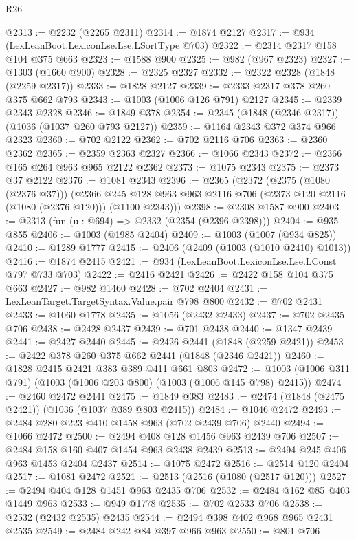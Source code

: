 \begin{lexlean}{R26}
\begin{coremodule}
@2313 := @2232 (@2265 @2311)
@2314 := @1874 @2127
@2317 := @934 (LexLeanBoot.LexiconLse.Lse.LSortType @703)
@2322 := @2314 @2317 @158 @104 @375 @663
@2323 := @1588 @900
@2325 := @982 (@967 @2323)
@2327 := @1303 (@1660 @900)
@2328 := @2325 @2327
@2332 := @2322 @2328 (@1848 (@2259 @2317))
@2333 := @1828 @2127
@2339 := @2333 @2317 @378 @260 @375 @662 @793
@2343 := @1003 (@1006 @126 @791) @2127
@2345 := @2339 @2343 @2328
@2346 := @1849 @378
@2354 := @2345 (@1848 (@2346 @2317)) (@1036 (@1037 @260 @793 @2127))
@2359 := @1164 @2343 @372 @374 @966 @2323
@2360 := @702 @2122
@2362 := @702 @2116 @706
@2363 := @2360 @2362
@2365 := @2359 @2363 @2327
@2366 := @1066 @2343
@2372 := @2366 @165 @264 @963 @965 @2122 @2362
@2373 := @1075 @2343
@2375 := @2373 @37 @2122
@2376 := @1081 @2343
@2396 := @2365
    (@2372
      (@2375 (@1080 (@2376 @37)))
      (@2366 @245 @128 @963 @963 @2116 @706 (@2373 @120 @2116 (@1080 (@2376 @120))) (@1100 @2343)))
@2398 := @2308 @1587 @900
@2403 := @2313 (fun (u : @694) => @2332 (@2354 (@2396 @2398)))
@2404 := @935 @855
@2406 := @1003 (@1985 @2404)
@2409 := @1003 (@1007 (@934 @825))
@2410 := @1289 @1777
@2415 := @2406 (@2409 (@1003 (@1010 @2410) @1013))
@2416 := @1874 @2415
@2421 := @934 (LexLeanBoot.LexiconLse.Lse.LConst @797 @733 @703)
@2422 := @2416 @2421
@2426 := @2422 @158 @104 @375 @663
@2427 := @982 @1460
@2428 := @702 @2404
@2431 := LexLeanTarget.TargetSyntax.Value.pair @798 @800
@2432 := @702 @2431
@2433 := @1060 @1778
@2435 := @1056 (@2432 @2433)
@2437 := @702 @2435 @706
@2438 := @2428 @2437
@2439 := @701 @2438
@2440 := @1347 @2439
@2441 := @2427 @2440
@2445 := @2426 @2441 (@1848 (@2259 @2421))
@2453 := @2422 @378 @260 @375 @662 @2441 (@1848 (@2346 @2421))
@2460 := @1828 @2415 @2421 @383 @389 @411 @661 @803
@2472 := @1003 (@1006 @311 @791) (@1003 (@1006 @203 @800) (@1003 (@1006 @145 @798) @2415))
@2474 := @2460 @2472 @2441
@2475 := @1849 @383
@2483 := @2474 (@1848 (@2475 @2421)) (@1036 (@1037 @389 @803 @2415))
@2484 := @1046 @2472
@2493 := @2484 @280 @223 @410 @1458 @963 (@702 @2439 @706) @2440
@2494 := @1066 @2472
@2500 := @2494 @408 @128 @1456 @963 @2439 @706
@2507 := @2484 @158 @160 @407 @1454 @963 @2438 @2439
@2513 := @2494 @245 @406 @963 @1453 @2404 @2437
@2514 := @1075 @2472
@2516 := @2514 @120 @2404
@2517 := @1081 @2472
@2521 := @2513 (@2516 (@1080 (@2517 @120)))
@2527 := @2494 @404 @128 @1451 @963 @2435 @706
@2532 := @2484 @162 @85 @403 @1449 @963
@2533 := @949 @1778
@2535 := @702 @2533 @706
@2538 := @2532 (@2432 @2535) @2435
@2544 := @2494 @398 @402 @968 @965 @2431 @2535
@2549 := @2484 @242 @84 @397 @966 @963
@2550 := @801 @706

\end{coremodule}
\end{lexlean}
